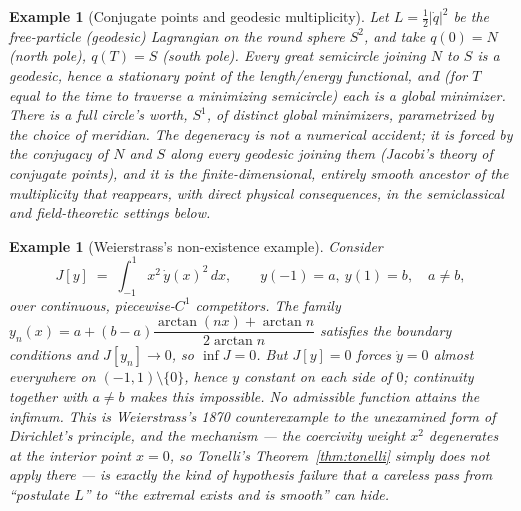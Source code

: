 \documentclass[11pt]{article}
\newtheorem{example}[theorem]{Example}
\begin{document}
\begin{example}[Conjugate points and geodesic multiplicity]
Let $L=\tfrac12|\dot q|^2$ be the free-particle (geodesic) Lagrangian on the round sphere $S^2$, and take $q(0)=N$ (north pole), $q(T)=S$ (south pole). Every great semicircle joining $N$ to $S$ is a geodesic, hence a stationary point of the length/energy functional, and (for $T$ equal to the time to traverse a minimizing semicircle) each is a global minimizer. There is a full circle's worth, $S^1$, of distinct global minimizers, parametrized by the choice of meridian. The degeneracy is not a numerical accident; it is forced by the conjugacy of $N$ and $S$ along every geodesic joining them (Jacobi's theory of conjugate points), and it is the finite-dimensional, entirely smooth ancestor of the multiplicity that reappears, with direct physical consequences, in the semiclassical and field-theoretic settings below.
\end{example}

\begin{example}[Weierstrass's non-existence example]
\label{ex:weierstrass}
Consider
\[
J[y] \;=\; \int_{-1}^{1} x^2\, \dot y(x)^2\, dx, \qquad y(-1)=a,\ y(1)=b,\quad a\ne b,
\]
over continuous, piecewise-$C^1$ competitors. The family $y_n(x)=a+(b-a)\dfrac{\arctan(nx)+\arctan n}{2\arctan n}$ satisfies the boundary conditions and $J[y_n]\to 0$, so $\inf J = 0$. But $J[y]=0$ forces $\dot y=0$ almost everywhere on $(-1,1)\setminus\{0\}$, hence $y$ constant on each side of $0$; continuity together with $a\ne b$ makes this impossible. \emph{No admissible function attains the infimum.} This is Weierstrass's 1870 counterexample to the unexamined form of Dirichlet's principle, and the mechanism --- the coercivity weight $x^2$ degenerates at the interior point $x=0$, so Tonelli's Theorem~\ref{thm:tonelli} simply does not apply there --- is exactly the kind of hypothesis failure that a careless pass from ``postulate $L$'' to ``the extremal exists and is smooth'' can hide.
\end{example}
\end{document}
